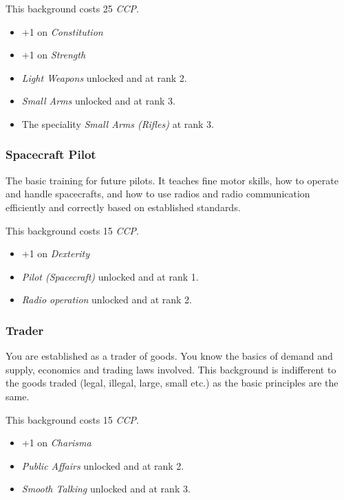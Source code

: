 This background costs 25 \emph{CCP}.

\begin{itemize}
\item +1 on \emph{Constitution}
\item +1 on \emph{Strength}
\item \emph{Light Weapons} unlocked and at rank 2.
\item \emph{Small Arms} unlocked and at rank 3.
\item The speciality \emph{Small Arms (Rifles)} at rank 3.
\end{itemize}

\subsubsection{Spacecraft Pilot}

The basic training for future pilots. It teaches fine motor skills, how to
operate and handle spacecrafts, and how to use radios and radio communication
efficiently and correctly based on established standards.

This background costs 15 \emph{CCP}.

\begin{itemize}
\item +1 on \emph{Dexterity}
\item \emph{Pilot (Spacecraft)} unlocked and at rank 1.
\item \emph{Radio operation} unlocked and at rank 2.
\end{itemize}

\subsubsection{Trader}

You are established as a trader of goods. You know the basics of demand and
supply, economics and trading laws involved. This background is indifferent
to the goods traded (legal, illegal, large, small etc.) as the basic principles
are the same.

This background costs 15 \emph{CCP}.

\begin{itemize}
\item +1 on \emph{Charisma}
\item \emph{Public Affairs} unlocked and at rank 2.
\item \emph{Smooth Talking} unlocked and at rank 3.
\end{itemize}
